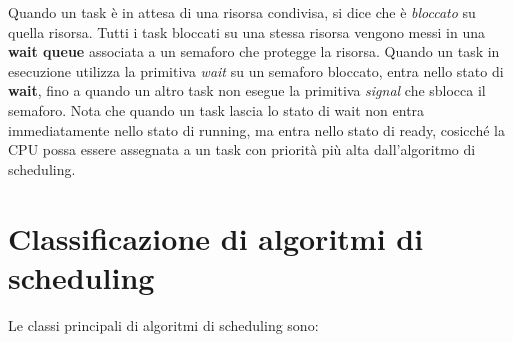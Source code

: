 \documentclass[12pt,openany,onesided]{book}
\begin{document}
\noindent Quando un task è in attesa di una risorsa condivisa, si dice che è \textit{bloccato} su quella risorsa.
Tutti i task bloccati su una stessa risorsa vengono messi in una \textbf{wait queue} associata a un semaforo che protegge la risorsa.
Quando un task in esecuzione utilizza la primitiva \textit{wait} su un semaforo bloccato, entra nello stato di \textbf{wait}, fino a quando un altro task non esegue la primitiva \textit{signal} che sblocca il semaforo.
Nota che quando un task lascia lo stato di wait non entra immediatamente nello stato di running, ma entra nello stato di ready, cosicché la CPU possa essere assegnata a un task con priorità più alta dall'algoritmo di scheduling.

\section{Classificazione di algoritmi di scheduling}
Le classi principali di algoritmi di scheduling sono:
\end{document}
